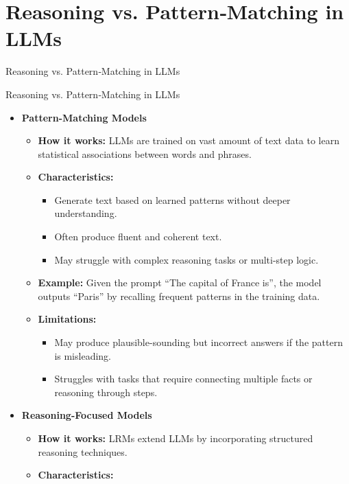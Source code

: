 \section{Reasoning vs. Pattern‑Matching in LLMs}
\begin{frame}{}
    \LARGE Reasoning vs. Pattern‑Matching in LLMs
\end{frame}

\begin{frame}[allowframebreaks]{Reasoning vs. Pattern‑Matching in LLMs}
    \begin{itemize}
        \item \textbf{Pattern-Matching Models}
        \begin{itemize}
            \item \textbf{How it works:} LLMs are trained on vast amount of text data to learn statistical associations between words and phrases.
            \item \textbf{Characteristics:}
            \begin{itemize}
                \item Generate text based on learned patterns without deeper understanding.
                \item Often produce fluent and coherent text.
                \item May struggle with complex reasoning tasks or multi-step logic.
            \end{itemize}
            \item \textbf{Example:} Given the prompt ``The capital of France is'', the model outputs ``Paris'' by recalling frequent patterns in the training data.
            \item \textbf{Limitations:}
            \begin{itemize}
                \item May produce plausible-sounding but incorrect answers if the pattern is misleading.
                \item Struggles with tasks that require connecting multiple facts or reasoning through steps.
            \end{itemize}
        \end{itemize}
    \framebreak
        \item \textbf{Reasoning-Focused Models}
        \begin{itemize}
            \item \textbf{How it works:} LRMs extend LLMs by incorporating structured reasoning techniques.
            \item \textbf{Characteristics:}

\end{itemize}
\end{itemize}
\end{frame}

